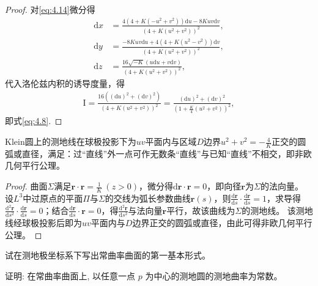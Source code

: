 \documentclass[../../main.tex]{subfiles}%
\begin{document}
\begin{proof}

对\eqref{eq:4.14}微分得
\begin{align*}
\mathrm{d}x&=\frac{4(4+K(-u^2+v^2))\mathrm{d}u-8Kuv\mathrm{d}v}{(4+K(u^2+v^2))^2},\\
\mathrm{d}y&=\frac{-8Kuv\mathrm{d}u+4(4+K(u^2-v^2))\mathrm{d}v}{(4+K(u^2+v^2))^2},\\
\mathrm{d}z&=\frac{16\sqrt{-K}(u\mathrm{d}u+v\mathrm{d}v)}{(4+K(u^2+v^2))^2},
\end{align*}
代入洛伦兹内积的诱导度量，得
\begin{align*}
\mathrm{I}=\frac{16((\mathrm{d}u)^2+(\mathrm{d}v)^2)}{(4+K(u^2+v^2))^2}=\frac{(\mathrm{d}u)^2+(\mathrm{d}v)^2}{\left(1+\frac{K}{4}(u^2+v^2)\right)^2},
\end{align*}
即式\eqref{eq:4.8}.

\end{proof}

\begin{theorem}
Klein圆上的测地线在球极投影下为$uv$平面内与区域$D$边界$u^2+v^2=-\frac{4}{K}$正交的圆弧或直径，满足：过“直线”外一点可作无数条“直线”与已知“直线”不相交，即非欧几何平行公理。
\end{theorem}

\begin{proof}

曲面$\Sigma$满足$\bm{r}\cdot\bm{r}=\frac{1}{K}\ (z>0)$，微分得$\mathrm{d}\bm{r}\cdot\bm{r}=0$，即向径$\bm{r}$为$\Sigma$的法向量。
设$L^3$中过原点的平面$\Pi$与$\Sigma$的交线为弧长参数曲线$\bm{r}(s)$，则$\frac{\mathrm{d}\bm{r}}{\mathrm{d}s}\cdot\frac{\mathrm{d}\bm{r}}{\mathrm{d}s}=1$，求导得$\frac{\mathrm{d}^2\bm{r}}{\mathrm{d}s^2}\cdot\frac{\mathrm{d}\bm{r}}{\mathrm{d}s}=0$；结合$\frac{\mathrm{d}\bm{r}}{\mathrm{d}s}\cdot\bm{r}=0$，得$\frac{\mathrm{d}^2\bm{r}}{\mathrm{d}s^2}$与法向量$\bm{r}$平行，故该曲线为$\Sigma$的测地线。
该测地线经球极投影后即为$uv$平面内与$D$边界正交的圆弧或直径，由此可得非欧几何平行公理。

\end{proof}

\begin{example}
试在测地极坐标系下写出常曲率曲面的第一基本形式。
\end{example}

\begin{example}
证明: 在常曲率曲面上, 以任意一点 $p$ 为中心的测地圆的测地曲率为常数。
\end{example}
\end{document}

